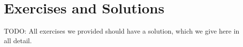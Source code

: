 \chapter{Exercises and Solutions}

TODO: All exercises we provided should have a solution, which we give here in all detail. 